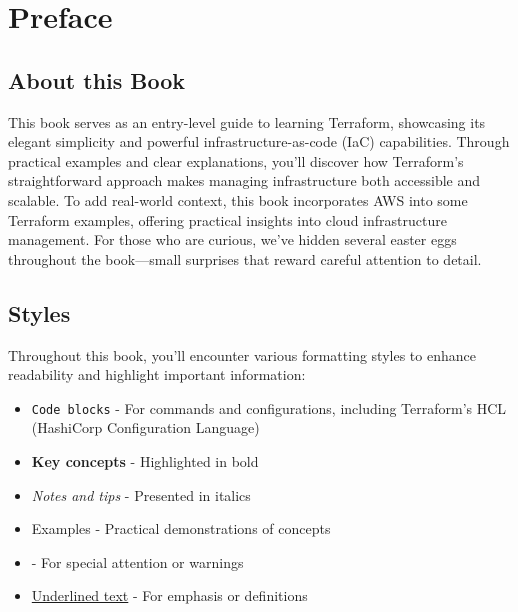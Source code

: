 \chapter*{Preface}

\section*{About this Book}

This book serves as an entry-level guide to learning Terraform, showcasing its elegant simplicity and powerful infrastructure-as-code (IaC) capabilities. Through practical examples and clear explanations, you'll discover how Terraform's straightforward approach makes managing infrastructure both accessible and scalable. To add real-world context, this book incorporates AWS into some Terraform examples, offering practical insights into cloud infrastructure management. For those who are curious, we've hidden several easter eggs throughout the book—small surprises that reward careful attention to detail.

\section*{Styles}

Throughout this book, you'll encounter various formatting styles to enhance readability and highlight important information:

\begin{itemize}[leftmargin=*,itemsep=0.1in] %
    \item \texttt{Code blocks} - For commands and configurations, including Terraform's HCL (HashiCorp Configuration Language)
    \item \textbf{Key concepts} - Highlighted in bold
    \item \textit{Notes and tips} - Presented in italics
    \item Examples - Practical demonstrations of concepts
    \item {} - For special attention or warnings
    \item \underline{Underlined text} - For emphasis or definitions
\end{itemize}

